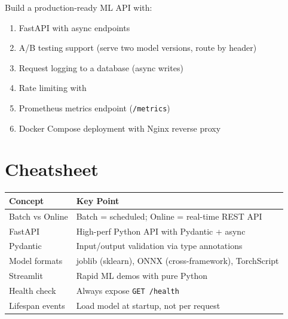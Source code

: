 \begin{exercise}
Build a production-ready ML API with:
\begin{enumerate}
  \item FastAPI with async endpoints
  \item A/B testing support (serve two model versions, route by header)
  \item Request logging to a database (async writes)
  \item Rate limiting with 
  \item Prometheus metrics endpoint (\texttt{/metrics})
  \item Docker Compose deployment with Nginx reverse proxy
\end{enumerate}
\end{exercise}

\section{Cheatsheet}

\begin{cheatsheet}[title=\textbf{Chapter 8 Summary}]
\begin{tabular}{@{}p{4cm}p{8.5cm}@{}}
\toprule
\textbf{Concept} & \textbf{Key Point} \\
\midrule
Batch vs Online & Batch = scheduled; Online = real-time REST API \\
FastAPI & High-perf Python API with Pydantic + async \\
Pydantic & Input/output validation via type annotations \\
Model formats & joblib (sklearn), ONNX (cross-framework), TorchScript \\
Streamlit & Rapid ML demos with pure Python \\
Health check & Always expose \texttt{GET /health} \\
Lifespan events & Load model at startup, not per request \\
\bottomrule
\end{tabular}
\end{cheatsheet}
